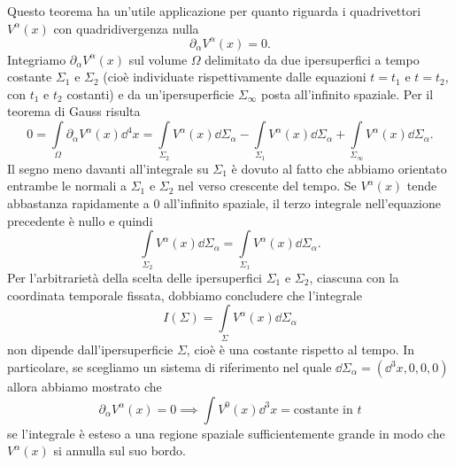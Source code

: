 Questo teorema ha un'utile applicazione per quanto riguarda i quadrivettori
$V^{\alpha}(x)$ con quadridivergenza nulla
\begin{equation}
  \partial_{\alpha}V^{\alpha}(x) = 0.
\end{equation}
Integriamo $\partial_{\alpha}V^{\alpha}(x)$ sul volume $\Omega$ delimitato da
due ipersuperfici a tempo costante $\Sigma_{1}$ e $\Sigma_{2}$ (cioè individuate
rispettivamente dalle equazioni $t = t_{1}$ e $t = t_{2}$, con $t_{1}$ e $t_{2}$
costanti) e da un'ipersuperficie $\Sigma_{\infty}$ posta all'infinito spaziale.
Per il teorema di Gauss risulta
\begin{equation}
  0 = \int\limits_{\Omega} \partial_{\alpha}V^{\alpha}(x) \dd^{4}x =
  \int\limits_{\Sigma_{2}} V^{\alpha}(x) \dd\Sigma_{\alpha} -
  \int\limits_{\Sigma_{1}} V^{\alpha}(x) \dd\Sigma_{\alpha} +
  \int\limits_{\Sigma_{\infty}} V^{\alpha}(x) \dd\Sigma_{\alpha}.
\end{equation}
Il segno meno davanti all'integrale su $\Sigma_{1}$ è dovuto al fatto che
abbiamo orientato entrambe le normali a $\Sigma_{1}$ e $\Sigma_{2}$ nel verso
crescente del tempo.  Se $V^{\alpha}(x)$ tende abbastanza rapidamente a $0$
all'infinito spaziale, il terzo integrale nell'equazione precedente è nullo e
quindi
\begin{equation}
  \int\limits_{\Sigma_{2}} V^{\alpha}(x) \dd\Sigma_{\alpha} =
  \int\limits_{\Sigma_{1}} V^{\alpha}(x) \dd\Sigma_{\alpha}.
\end{equation}
Per l'arbitrarietà della scelta delle ipersuperfici $\Sigma_{1}$ e $\Sigma_{2}$,
ciascuna con la coordinata temporale fissata, dobbiamo concludere che
l'integrale
\begin{equation}
  I(\Sigma) = \int\limits_{\Sigma} V^{\alpha}(x) \dd\Sigma_{\alpha}
\end{equation}
non dipende dall'ipersuperficie $\Sigma$, cioè è una costante rispetto al tempo.
In particolare, se scegliamo un sistema di riferimento nel quale
$\dd\Sigma_{\alpha} = (\dd^{3} x, 0, 0, 0)$ allora abbiamo mostrato che
\begin{equation}
  \partial_{\alpha}V^{\alpha}(x) = 0 \implies \int V^{0}(x) \dd^{3} x =
  \text{costante in $t$}
\end{equation}
se l'integrale è esteso a una regione spaziale sufficientemente grande in modo
che $V^{\alpha}(x)$ si annulla sul suo bordo.

